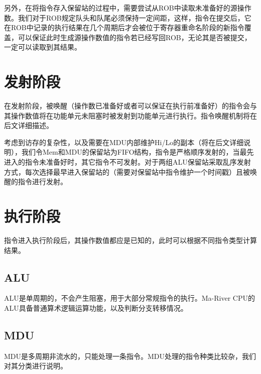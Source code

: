 另外，在将指令存入保留站的过程中，需要尝试从ROB中读取未准备好的源操作数。我们对于ROB规定队头和队尾必须保持一定间距，这样，指令在提交后，它在ROB中记录的执行结果在几个周期后才会被位于寄存器重命名阶段的新指令覆盖，可以保证此时生成源操作数值的指令若已经写回ROB，无论其是否被提交，一定可以读取到其结果。

\section{发射阶段}

在发射阶段，被唤醒（操作数已准备好或者可以保证在执行前准备好）的指令会与其操作数值将在功能单元未阻塞时被发射到功能单元进行执行。指令唤醒机制将在后文详细描述。

考虑到访存的复杂性，以及需要在MDU内部维护Hi/Lo的副本（将在后文详细说明），我们令Mem和MDU的保留站为FIFO结构，指令是严格顺序发射的，当最先进入的指令未准备好时，其它指令不可发射。对于两组ALU保留站采取乱序发射方式，每次选择最早进入保留站的（需要对保留站中指令维护一个时间戳）且被唤醒的指令进行发射。

\section{执行阶段}

指令进入执行阶段后，其操作数值都应是已知的，此时可以根据不同指令类型计算结果。

\subsection{ALU}

ALU是单周期的，不会产生阻塞，用于大部分常规指令的执行。Ma-River CPU的ALU具备普通算术逻辑运算功能，以及判断分支转移情况。

\subsection{MDU}

MDU是多周期非流水的，只能处理一条指令。MDU处理的指令种类比较杂，我们对其分类进行说明。

